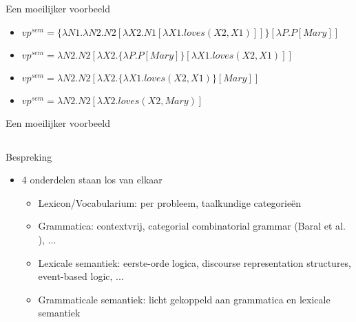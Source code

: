 \documentclass[notes, dvipsnames]{beamer}
\newcommand{\hitem}{
	\ppause
	\item
}
\newcommand{\ppause}{\onslide<+>}
\newcommand{\attention}[1]{\textcolor{ForestGreen}{#1}}
\begin{document}
	\begin{frame}{Een moeilijker voorbeeld}
    \begin{itemize}
      \hitem $vp^{sem} = \{\lambda N1.\lambda N2.N2[\lambda X2.N1[\lambda X1.loves(X2,X1)]]\}[\lambda P.P[Mary]]$
      \hitem $vp^{sem} = \lambda N2.N2[\lambda X2.\{\lambda P.P[Mary]\}[\lambda X1.loves(X2,X1)]]$
      \hitem $vp^{sem} = \lambda N2.N2[\lambda X2.\{\lambda X1.loves(X2,X1)\}[Mary]]$
      \hitem $vp^{sem} = \lambda N2.N2[\lambda X2.loves(X2,Mary)]$
    \end{itemize}
	\end{frame}
	\begin{frame}{Een moeilijker voorbeeld}
	\end{frame}

  \subsection{}
	\begin{frame}{Bespreking}
    \begin{itemize}
      \hitem 4 onderdelen staan los van elkaar
      \begin{itemize}
        \hitem Lexicon/Vocabularium: per probleem, taalkundige categorieën
        \hitem Grammatica: contextvrij, categorial combinatorial grammar (Baral et al. \cite{Baral2008}), ...
        \hitem Lexicale semantiek: eerste-orde logica, discourse representation structures, event-based logic, ...
        \hitem Grammaticale semantiek: licht gekoppeld aan grammatica en lexicale semantiek
      \end{itemize}
    \end{itemize}
	\end{frame}
\end{document}
